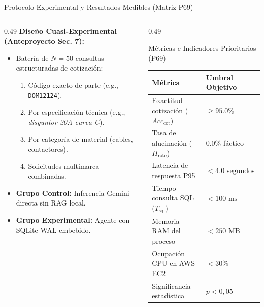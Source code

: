 \documentclass[aspectratio=169, 10pt]{beamer}
\begin{document}
\begin{frame}{Protocolo Experimental y Resultados Medibles (Matriz P69)}
  \begin{columns}[t]
    \begin{column}{0.49\textwidth}
      \textbf{Diseño Cuasi-Experimental (Anteproyecto Sec. 7):}
      \begin{itemize}\footnotesize\setlength{\itemsep}{2pt}
        \item Batería de $N = 50$ consultas estructuradas de cotización:
          \begin{enumerate}\scriptsize
            \item Código exacto de parte (e.g., \texttt{DOM12124}).
            \item Por especificación técnica (e.g., \textit{disyuntor 20A curva C}).
            \item Por categoría de material (cables, contactores).
            \item Solicitudes multimarca combinadas.
          \end{enumerate}
        \item \textbf{Grupo Control:} Inferencia Gemini directa sin RAG local.
        \item \textbf{Grupo Experimental:} Agente con SQLite WAL embebido.
      \end{itemize}
    \end{column}
    
    \begin{column}{0.49\textwidth}
      \begin{block}{Métricas e Indicadores Prioritarios (P69)}
        \scriptsize
        \setlength{\tabcolsep}{3pt}
        \renewcommand{\arraystretch}{0.92}
        \begin{tabular}{p{3.2cm} p{2.8cm}}
          \toprule
          \textbf{Métrica} & \textbf{Umbral Objetivo} \\
          \midrule
          Exactitud cotización ($Acc_{\text{cot}}$) & $\ge 95.0\%$ \\
          Tasa de alucinación ($H_{\text{rate}}$) & $0.0\%$ fáctico \\
          Latencia de respuesta P95 & $< 4.0\text{ segundos}$ \\
          Tiempo consulta SQL ($T_{\text{sql}}$) & $< 100\text{ ms}$ \\
          Memoria RAM del proceso & $< 250\text{ MB}$ \\
          Ocupación CPU en AWS EC2 & $< 30\%$ \\
          Significancia estadística & $p < 0{,}05$ \\
          \bottomrule
        \end{tabular}
      \end{block}
      

\end{column}
\end{columns}
\end{frame}
\end{document}

